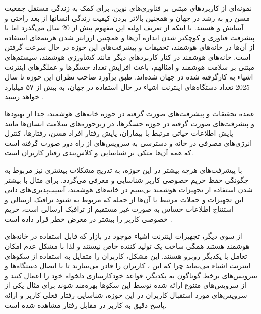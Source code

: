 
 نمونه‌ای از کاربردهای مبتنی بر فناوری‌های نوین، برای کمک به زندگی مستقل جمعیت مسن رو به رشد در جهان و همچنین بالاتر بردن کیفیت زندگی انسانها از بعد راحتی و آسایش و  هستند. با اینکه از تعریف اولیه این مفهوم بیش از 20 سال می‌گذرد اما با پیشرفت فناوری  و کوچکتر شدن اندازه آن‌ها و همچنین ارزانتر شدن هزینه‌های استفاده از آن‌ها در خانه‌های هوشمند، تحقیقات و پیشرفت‌های این حوزه در حال سرعت گرفتن است. خانه‌های هوشمند در کنار کاربردهای دیگر  مانند کشاورزی هوشمند، سیستم‌های مبتنی بر سلامت هوشمند و امثالهم، باعث افزایش تعداد حسگرها و عملگرهای اینترنت اشیاء به کارگرفته شده در جهان شده‌اند. طبق برآورد صاحب نظران اين حوزه ﺗﺎ ﺳﺎل 2025 ﺗﻌﺪاد دﺳﺘﮕﺎهﻫﺎی اﯾﻨﺘﺮﻧﺖ اﺷﯿﺎء در ﺣﺎل اﺳﺘﻔﺎده در ﺟﻬﺎن، ﺑﻪ ﺑﯿﺶ از ۵۷ ﻣﯿﻠﯿﺎرد ﺧﻮاﻫﺪ رسید \cite{x11}.

عمده تحقیقات و پیشرفت‌های صورت گرفته در حوزه خانه‌های هوشمند، جدا از بهبودها و پیشرفت‌های صورت گرفته در حوزه حسگرها، در زیرحوزه‌های سلامت انسان‌ها مانند پایش اطلاعات حیاتی مرتبط با بیماران، پایش رفتار افراد مسن،  رفتارها، کنترل انرژی‌های مصرفی در خانه و دسترسی به سرویس‌های از راه دور صورت گرفته است که همه آن‌ها متکی بر شناسایی و کلاس‌بندی رفتار کاربران است.

با پیشرفت‌های هرچه بیشتر در این حوزه، به تدريج مشکلات بیشتری نیز مربوط به چگونگی حفظ حریم‌ خصوصی کاربر شناسایی و معرفی می‌گردد. برای مثال با بیشتر شدن استفاده از تجهیزات هوشمند بی‌سیم در خانه‌های هوشمند، آسیب‌پذیری‌های ذاتی این تجهيزات و حملات مرتبط با آن‌ها از جمله  که مربوط به شنود ترافیک ارسالی و استنتاج اطلاعات حساس به صورت غیر مستقیم از ترافیک ارسالی است، حریم خصوصی کاربر را بیشتر در معرض خطر قرار داده است \cite{x12}. 

از سوی ديگر، تجهیزات اینترنت اشیاء موجود در بازار که قابل استفاده در خانه‌های هوشمند هستند همگی ساخت یک تولید کننده خاص نیستند و لذا با مشکل عدم امکان ﺗﻌﺎﻣﻞ با یکديگر روبرو هستند. این مشکل، کاربران را متمایل به استفاده از ﺳﮑﻮﻫﺎی اﯾﻨﺘﺮﻧﺖ اﺷﯿﺎء می‌نمايد چرا که این ، ﮐﺎرﺑﺮان را ﻗﺎدر ﻣﯽﺳﺎزﻧﺪ ﺗﺎ ﺑﺎ اﺗﺼﺎل دﺳﺘﮕﺎهﻫﺎ و ﺳﺮوﯾﺲﻫﺎی ﺑﺮﺧط ﮔﻮﻧﺎﮔﻮن ﺑﻪ ﯾﮑﺪﯾﮕﺮ، قواعد ﺧﻮدﮐﺎرﺳﺎزی دﻟﺨﻮاه خود را اﻋﻤﺎل ﮐﻨﻨﺪ و از سرویس‌های متنوع ارائه شده توسط این سکوها بهره‌مند شوند برای مثال یکی از سرویس‌های مورد استقبال کاربران در این حوزه، شناسایی رفتار فعلی کاربر و ارائه پاسخ دقیق به کاربر در مقابل رفتار مشاهده شده است.

